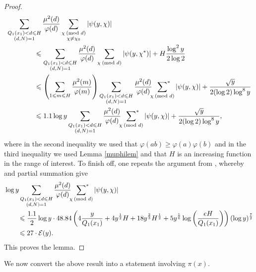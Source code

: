 \documentclass[12pt]{amsart}
\begin{document}
\begin{proof}
    \begin{align}
        &\sum_{\substack{Q_1(x_1)< d\le H\\(d,N)=1}}\frac{\mu^2(d)}{\varphi(d)} \sum_{\substack{\chi \: (\text{mod }d) \\ \chi \ne \chi_0}} |\psi(y, \chi)|\nonumber\\
        &\qquad\qquad\le \sum_{\substack{Q_1(x_1)< d\le H\\(d,N)=1}}\frac{\mu^2(d)}{\varphi(d)}\sum_{\chi\: (\text{mod }d)}|\psi(y,\chi^*)|+H\frac{\log^2y}{2\log 2}\nonumber\\
        &\qquad\qquad\le\left(\sum_{1\le m\le H}\frac{\mu^2(m)}{\varphi(m)}\right) \sum_{\substack{Q_1(x_1)<d\le H\\(d,N)=1}}\frac{\mu^2(d)}{\varphi(d)}\sideset{}{^*}\sum_{\chi\: (\text{mod }d)}|\psi(y,\chi)|+\frac{\sqrt{y}}{2(\log 2)\log^{8}y} \nonumber\\
        &\qquad\qquad\le 1.1\log y\sum_{\substack{Q_1(x_1)<d\le H\\(d,N)=1}}\frac{\mu^2(d)}{\varphi(d)}\sideset{}{^*}\sum_{\chi\: (\text{mod }d)}|\psi(y,\chi)|+\frac{\sqrt{y}}{2(\log 2)\log^{8}y}, \label{eq: case Q_1 < d < H, part 2}
    \end{align}
    where in the second inequality we used that $\varphi(ab)\ge\varphi(a)\varphi(b)$ and in the third inequality we used Lemma \ref{muphilem} and that $H$ is an increasing function in the range of interest. To finish off, one repeats the argument from \cite[pp. 1929--1930]{Akbary}, whereby \cite[Theorem 1.2]{Akbary} and partial summation give
    \begin{align*}
        &\log y\sum_{\substack{Q_1(x_1)<d\le H\\(d,N)=1}}\frac{\mu^2(d)}{\varphi(d)}\sideset{}{^*}\sum_{\chi\: (\text{mod }d)}|\psi(y,\chi)|\\
        &\qquad\le\frac{1.1}{2}\log y\cdot 48.84\left(4\frac{y}{Q_1(x_1)}+4y^{\frac{1}{2}}H+18y^{\frac{2}{3}}H^{\frac{1}{2}}+5y^{\frac{5}{6}}\log\left(\frac{eH}{Q_1(x_1)}\right)\right)(\log y)^{\frac{7}{2}}\\
        &\qquad\le 27\cdot \mathcal{E}(y).
    \end{align*}
    This proves the lemma.
\end{proof}

We now convert the above result into a statement involving $\pi(x)$.
\end{document}
